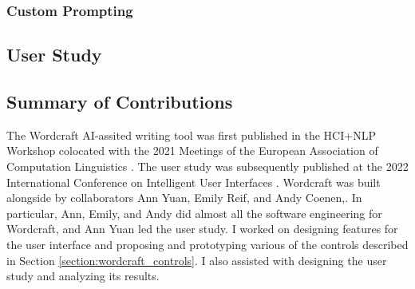 \subsubsection{Custom Prompting}

\subsection{User Study}


\subsection{Summary of Contributions}
The Wordcraft AI-assited writing tool was first published in the HCI+NLP Workshop colocated with the 2021 Meetings of the European Association of Computation Linguistics \citep{wordcraft}.
The user study was subsequently published at the 2022 International Conference on Intelligent User Interfaces \citep{yuan2022wordcraft}.
Wordcraft was built alongside by collaborators Ann Yuan, Emily Reif, and Andy Coenen,.
In particular, Ann, Emily, and Andy did almost all the software engineering for Wordcraft, and Ann Yuan led the user study.
I worked on designing features for the user interface and proposing and prototyping various of the controls described in Section \ref{section:wordcraft_controls}.
I also assisted with designing the user study and analyzing its results.
